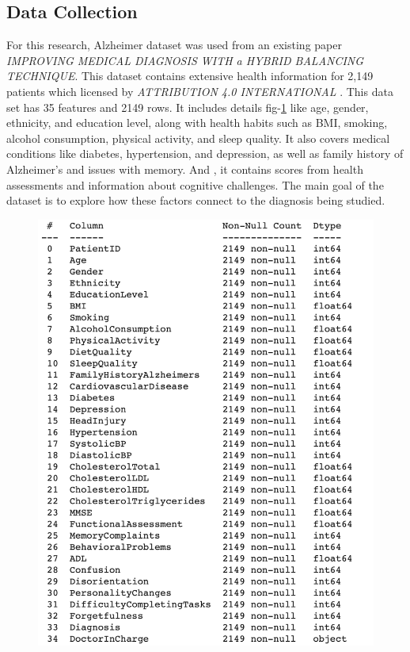 \documentclass[conference]{IEEEtran} %
\begin{document}
\subsection{Data Collection }
For this research, Alzheimer dataset was used from an existing paper \textit{IMPROVING MEDICAL DIAGNOSIS WITH a HYBRID BALANCING TECHNIQUE}\cite{ref2}. This dataset contains extensive health information for 2,149 patients which licensed by \textit{ATTRIBUTION 4.0 INTERNATIONAL} \cite{ref3}. This data set has 35 features and 2149 rows. It includes details fig-\ref{fig:dbdetails} like age, gender, ethnicity, and education level, along with health habits such as BMI, smoking, alcohol consumption, physical activity, and sleep quality. It also covers medical conditions like diabetes, hypertension, and depression, as well as family history of Alzheimer’s and issues with memory. And , it contains scores from health assessments and information about cognitive challenges. The main goal of the dataset is to explore how these factors connect to the diagnosis being studied.
\begin{figure}[ht]
    \centering
    \includegraphics[width=\linewidth]{Fig-03.pdf}
    \caption{}
    \label{fig:dbdetails}
\end{figure}
\FloatBarrier
\end{document}

